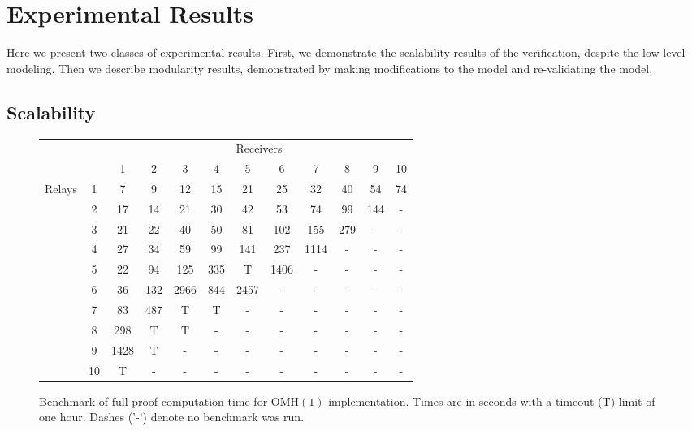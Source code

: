 \documentclass{llncs/llncs}
\newcommand{\OMH}{\ensuremath{\mathrm{OMH}}\xspace}
\newcommand{\TO}{\ensuremath{\bm{\mathrm{T}}}\xspace}
\begin{document}
{%
\section{Experimental Results}\label{sec:experimental}

Here we present two classes of experimental results. First, we demonstrate the scalability results of the verification, despite the low-level modeling. Then we describe modularity results, demonstrated by making modifications to the model and re-validating the model.

\subsection{Scalability}

\begin{figure}
  \centering
  \begin{tabular}{c|c||c|c|c|c|c|c|c|c|c|c|}
      \multicolumn{1}{r}{} & \multicolumn{1}{r}{} & \multicolumn{10}{c}{Receivers} \\
      \cline{2-12}
          &     & 1  &  2  &   3  &  4  &   5  &  6   &  7   &  8  &  9  &  10 \\
      \cline{2-12} \cline{2-12}
          \multirow{10}{*}{Relays\phantom{x}} &
            1   & 7    & 9   & 12   & 15  & 21   & 25   & 32   & 40  & 54  & 74  \\
      \cline{2-12}
          & 2   & 17   & 14  & 21   & 30  & 42   & 53   & 74   & 99  & 144 & -   \\
      \cline{2-12}
          & 3   & 21   & 22  & 40   & 50  & 81   & 102  & 155  & 279 & -   & -   \\
      \cline{2-12}
          & 4   & 27   & 34  & 59   & 99  & 141  & 237  & 1114 & -   & -   & -   \\
      \cline{2-12}
          & 5   & 22   & 94  & 125  & 335 & \TO   & 1406 & -    & -   & -   & -   \\
      \cline{2-12}
          & 6   & 36   & 132 & 2966 & 844 & 2457 & -    & -    & -   & -   & -   \\
      \cline{2-12}
          & 7   & 83   & 487 & \TO   & \TO  & -    & -    & -    & -   & -   & -   \\
      \cline{2-12}
          & 8   & 298  & \TO  & \TO   & -   & -    & -    & -    & -   & -   & -   \\
      \cline{2-12}
          & 9   & 1428 & \TO  & -    & -   & -    & -    & -    & -   & -   & -   \\
      \cline{2-12}
          & 10   & \TO   & -   & -    & -   & -    & -    & -    & -   & -   & -   \\
      \cline{2-12}
  \end{tabular}
  \caption{Benchmark of full proof computation time for $\OMH(1)$ implementation. Times are in seconds with a timeout (\TO) limit of one hour. Dashes ('-') denote no benchmark was run.}
  \label{fig:benchmark}
\end{figure}

}
\end{document}
